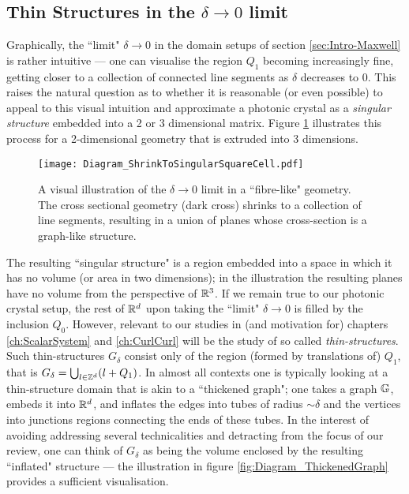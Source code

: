 \subsection{Thin Structures in the $\delta\rightarrow0$ limit} \label{ssec:Intro-ThinStructures}
Graphically, the ``limit" $\delta\rightarrow0$ in the domain setups of section \ref{sec:Intro-Maxwell} is rather intuitive --- one can visualise the region $Q_1$ becoming increasingly fine, getting closer to a collection of connected line segments as $\delta$ decreases to 0.
This raises the natural question as to whether it is reasonable (or even possible) to appeal to this visual intuition and approximate a photonic crystal as a \emph{singular structure} embedded into a 2 or 3 dimensional matrix.
Figure \ref{fig:Diagram_ShrinkToSingularSquareCell} illustrates this process for a 2-dimensional geometry that is extruded into 3 dimensions.
\begin{figure}[h]
	\centering
	\texttt{[image: Diagram\_ShrinkToSingularSquareCell.pdf]}
	\caption[Visual illustration of the singular limit of a thin-structure geometry.]{\label{fig:Diagram_ShrinkToSingularSquareCell} A visual illustration of the $\delta\rightarrow0$ limit in a ``fibre-like" geometry. The cross sectional geometry (dark cross) shrinks to a collection of line segments, resulting in a union of planes whose cross-section is a graph-like structure.}
\end{figure}
The resulting ``singular structure" is a region embedded into a space in which it has no volume (or area in two dimensions); in the illustration the resulting planes have no volume from the perspective of $\mathbb{R}^3$.
If we remain true to our photonic crystal setup, the rest of $\mathbb{R}^d$ upon taking the ``limit" $\delta\rightarrow0$ is filled by the inclusion $Q_0$.
However, relevant to our studies in (and motivation for) chapters \ref{ch:ScalarSystem} and \ref{ch:CurlCurl} will be the study of so called \emph{thin-structures}.
Such thin-structures $G_{\delta}$ consist only of the region (formed by translations of) $Q_1$, that is $G_{\delta} = \bigcup_{l\in\mathbb{Z}^d}(l+Q_1)$.
In almost all contexts one is typically looking at a thin-structure domain that is akin to a ``thickened graph"; one takes a graph $\mathbb{G}$, embeds it into $\mathbb{R}^d$, and inflates the edges into tubes of radius $\sim\delta$ and the vertices into junctions regions connecting the ends of these tubes.
In the interest of avoiding addressing several technicalities and detracting from the focus of our review, one can think of $G_{\delta}$ as being the volume enclosed by the resulting ``inflated" structure --- the illustration in figure \ref{fig:Diagram_ThickenedGraph} provides a sufficient visualisation.
